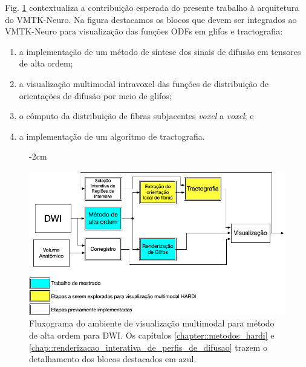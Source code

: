 \documentclass[
    12pt,                %
    oneside,            %
    a4paper,            %
    english,            %
    french,                %
    spanish,            %
    brazil                %
    ]{abntex2}
\begin{document}
Fig. \ref{fig::flowchart_vmtk_hardi} contextualiza a contribuição esperada do presente trabalho à arquitetura do VMTK-Neuro. Na figura destacamos os blocos que devem ser integrados ao VMTK-Neuro para visualização das funções ODFs em glifos e tractografia: 

\begin{enumerate}
    \item a implementação de um método de síntese dos sinais de difusão em tensores de alta ordem;
    \item a visualização multimodal intravoxel das funções de distribuição de orientações de difusão por meio de glifos;
    \item o cômputo da distribuição de fibras subjacentes \textit{voxel} a \textit{voxel}; e
    \item a implementação de um algoritmo de tractografia.
\end{enumerate}

\begin{figure}[ht]
   \centering
       \addtolength{\leftskip} {-2cm} %
    \addtolength{\rightskip}{-2cm}

    \centering
    \includegraphics[width=.9\linewidth, angle=0]{figs/Introducao/fluxograma_VMTK_HARDI.png}
    \caption{Fluxograma do ambiente de visualização multimodal para método de alta ordem para DWI. Os capítulos \ref{chapter::metodos_hardi} e \ref{chap::renderizacao_interativa_de_perfis_de_difusao} trazem o detalhamento dos blocos destacados em azul.}
    \label{fig::flowchart_vmtk_hardi}
\end{figure}
\end{document}
